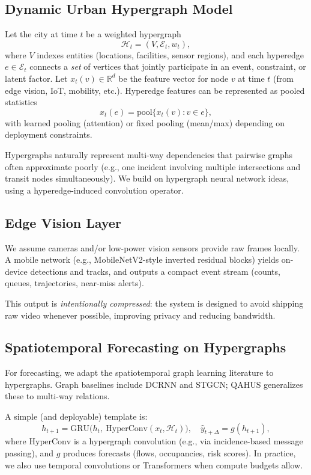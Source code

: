 \documentclass[11pt]{article}
\begin{document}
\subsection{Dynamic Urban Hypergraph Model}
Let the city at time $t$ be a weighted hypergraph
\[
\mathcal{H}_t = (V, \mathcal{E}_t, w_t),
\]
where $V$ indexes entities (locations, facilities, sensor regions), and each hyperedge
$e \in \mathcal{E}_t$ connects a \emph{set} of vertices that jointly participate in an event, constraint, or latent factor.
Let $x_t(v) \in \mathbb{R}^d$ be the feature vector for node $v$ at time $t$ (from edge vision, IoT, mobility, etc.).
Hyperedge features can be represented as pooled statistics
\[
x_t(e) = \mathrm{pool}\{x_t(v): v\in e\},
\]
with learned pooling (attention) or fixed pooling (mean/max) depending on deployment constraints.

Hypergraphs naturally represent multi-way dependencies that pairwise graphs often approximate poorly
(e.g., one incident involving multiple intersections and transit nodes simultaneously). We build on
hypergraph neural network ideas, using a hyperedge-induced convolution operator. \citep{feng2019hypergraph}

\subsection{Edge Vision Layer}
We assume cameras and/or low-power vision sensors provide raw frames locally.
A mobile network (e.g., MobileNetV2-style inverted residual blocks) yields on-device detections and tracks,
and outputs a compact event stream (counts, queues, trajectories, near-miss alerts). \citep{sandler2018mobilenetv2}

This output is \emph{intentionally compressed}: the system is designed to avoid shipping raw video whenever
possible, improving privacy and reducing bandwidth.

\subsection{Spatiotemporal Forecasting on Hypergraphs}
For forecasting, we adapt the spatiotemporal graph learning literature to hypergraphs.
Graph baselines include DCRNN and STGCN; QAHUS generalizes these to multi-way relations. \citep{li2018dcrnn,yu2018stgcn}

A simple (and deployable) template is:
\[
h_{t+1} = \mathrm{GRU}\Big(h_t,\ \mathrm{HyperConv}(x_t, \mathcal{H}_t)\Big),
\quad
\hat{y}_{t+\Delta} = g(h_{t+1}),
\]
where $\mathrm{HyperConv}$ is a hypergraph convolution (e.g., via incidence-based message passing), and $g$
produces forecasts (flows, occupancies, risk scores). In practice, we also use temporal convolutions or
Transformers when compute budgets allow.
\end{document}
